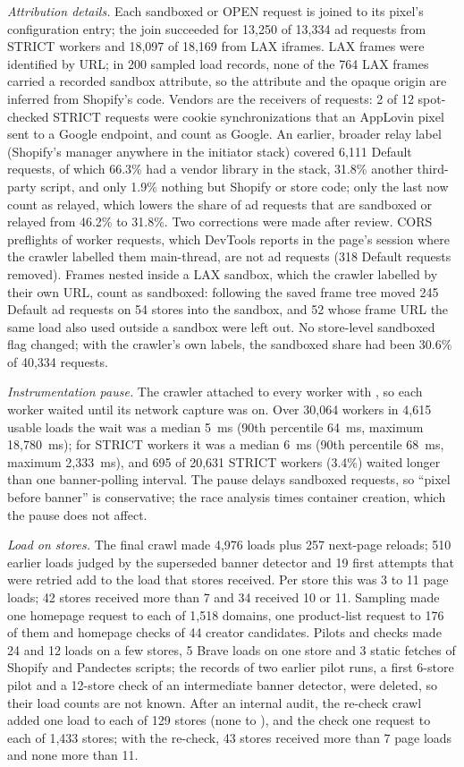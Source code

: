 \documentclass[preprint,11pt,authoryear,a4paper]{elsarticle}
\begin{document}
\emph{Attribution details.} Each sandboxed or OPEN request is joined to its pixel's configuration entry; the join succeeded for 13,250 of 13,334 ad requests from STRICT workers and 18,097 of 18,169 from LAX iframes. LAX frames were identified by URL; in 200 sampled load records, none of the 764 LAX frames carried a recorded sandbox attribute, so the attribute and the opaque origin are inferred from Shopify's code. Vendors are the receivers of requests: 2 of 12 spot-checked STRICT requests were cookie synchronizations that an AppLovin pixel sent to a Google endpoint, and count as Google. An earlier, broader relay label (Shopify's manager anywhere in the initiator stack) covered 6,111 Default requests, of which 66.3\% had a vendor library in the stack, 31.8\% another third-party script, and only 1.9\% nothing but Shopify or store code; only the last now count as relayed, which lowers the share of ad requests that are sandboxed or relayed from 46.2\% to 31.8\%. Two corrections were made after review. CORS preflights of worker requests, which DevTools reports in the page's session where the crawler labelled them main-thread, are not ad requests (318 Default requests removed). Frames nested inside a LAX sandbox, which the crawler labelled by their own URL, count as sandboxed: following the saved frame tree moved 245 Default ad requests on 54 stores into the sandbox, and 52 whose frame URL the same load also used outside a sandbox were left out. No store-level sandboxed flag changed; with the crawler's own labels, the sandboxed share had been 30.6\% of 40,334 requests.

\emph{Instrumentation pause.} The crawler attached to every worker with , so each worker waited until its network capture was on. Over 30,064 workers in 4,615 usable loads the wait was a median 5~ms (90th percentile 64~ms, maximum 18,780~ms); for STRICT workers it was a median 6~ms (90th percentile 68~ms, maximum 2,333~ms), and 695 of 20,631 STRICT workers (3.4\%) waited longer than one banner-polling interval. The pause delays sandboxed requests, so ``pixel before banner'' is conservative; the race analysis times container creation, which the pause does not affect.

\emph{Load on stores.} The final crawl made 4,976 loads plus 257 next-page reloads; 510 earlier loads judged by the superseded banner detector and 19 first attempts that were retried add to the load that stores received. Per store this was 3 to 11 page loads; 42 stores received more than 7 and 34 received 10 or 11. Sampling made one homepage request to each of 1,518 domains, one product-list request to 176 of them and homepage checks of 44 creator candidates. Pilots and checks made 24 and 12 loads on a few stores, 5 Brave loads on one store and 3 static fetches of Shopify and Pandectes scripts; the records of two earlier pilot runs, a first 6-store pilot and a 12-store check of an intermediate banner detector, were deleted, so their load counts are not known. After an internal audit, the re-check crawl added one load to each of 129 stores (none to \storeC), and the  check one request to each of 1,433 stores; with the re-check, 43 stores received more than 7 page loads and none more than 11.
\end{document}
